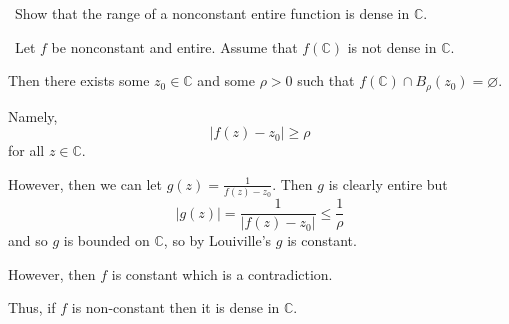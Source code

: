 \documentclass[12pt]{Homework}
\begin{document}
\begin{problem} $\,$
Show that the range of a nonconstant entire function is dense in $\mathbb{C}$.
\end{problem}


\begin{solution}$\,$
Let $f$ be nonconstant and entire. Assume that $f(\mathbb{C})$ is not dense in $\mathbb{C}$.

Then there exists some $z_0\in\mathbb{C}$ and some $\rho>0$ such that $f(\mathbb{C})\cap B_\rho(z_0)=\varnothing$.

Namely, $$|f(z)-z_0|\ge\rho$$ for all $z\in\mathbb{C}$.

However, then we can let $g(z)=\frac{1}{f(z)-z_0}$. Then $g$ is clearly entire but $$|g(z)|=\frac{1}{|f(z)-z_0|}\le\frac{1}{\rho}$$ and so $g$ is bounded on $\mathbb{C}$, so by Louiville's $g$ is constant.

However, then $f$ is constant which is a contradiction.

Thus, if $f$ is non-constant then it is dense in $\mathbb{C}$.

\end{solution}
\end{document}
